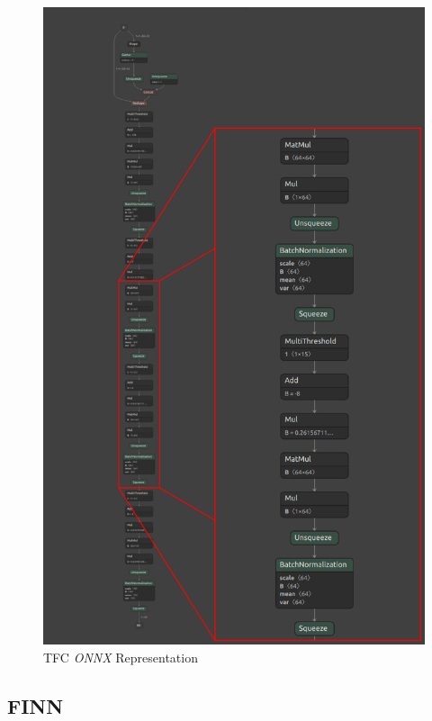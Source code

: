 \begin{figure}[htbp]
	\centering
		\includegraphics[width=12cm]{Figures/ONNXBeginning.png}
	\caption[TFC \emph{ONNX} representation]{TFC \emph{ONNX} Representation}
	\label{fig:ONNXBeginning}
\end{figure}

\newpage


\subsection{FINN}

